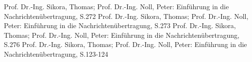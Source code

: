 

\begin{thebibliography}{999}
  Prof. Dr.-Ing. Sikora, Thomas; Prof. Dr.-Ing. Noll, Peter: Einführung in die
 Nachrichtenübertragung, S.272
 Prof. Dr.-Ing. Sikora, Thomas; Prof. Dr.-Ing. Noll, Peter: Einführung in die
 Nachrichtenübertragung, S.273
 Prof. Dr.-Ing. Sikora, Thomas; Prof. Dr.-Ing. Noll, Peter: Einführung in die
 Nachrichtenübertragung, S.276
  Prof. Dr.-Ing. Sikora, Thomas; Prof. Dr.-Ing. Noll, Peter: Einführung in die
 Nachrichtenübertragung, S.123-124



\end{thebibliography}


  	    
